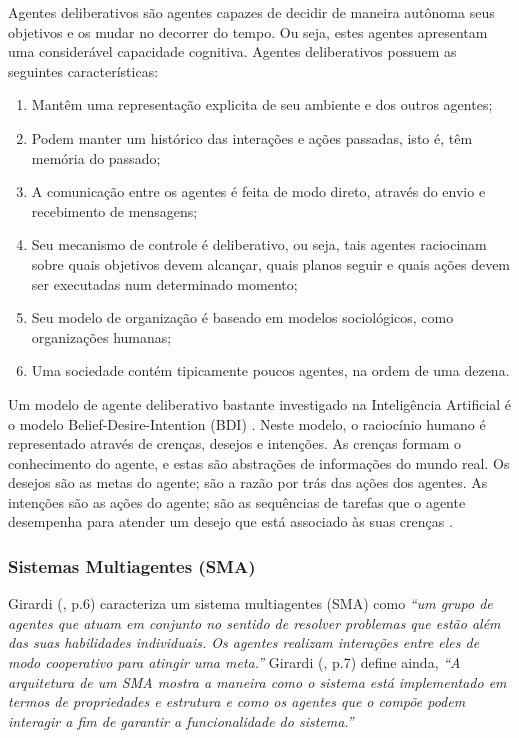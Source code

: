 Agentes deliberativos são agentes capazes de decidir de maneira autônoma seus objetivos e os mudar no decorrer do tempo. Ou seja, estes agentes apresentam uma considerável capacidade cognitiva. Agentes deliberativos possuem as seguintes características:
\begin{citacao}
\begin{enumerate}

	\item Mantêm uma representação explicita de seu ambiente e dos outros agentes;
	\item Podem manter um histórico das interações e ações passadas, isto é, têm memória do passado;
	\item A comunicação entre os agentes é feita de modo direto, através do envio e recebimento de mensagens;
	\item Seu mecanismo de controle é deliberativo, ou seja, tais agentes raciocinam sobre quais objetivos devem alcançar, quais planos seguir e quais ações devem ser executadas num determinado momento;
	\item Seu modelo de organização é baseado em modelos sociológicos, como organizações humanas;
	\item Uma sociedade contém tipicamente poucos agentes, na ordem de uma dezena.
	 \newline {}

\end{enumerate}
\end{citacao}

Um modelo de agente deliberativo bastante investigado na Inteligência Artificial é o modelo Belief-Desire-Intention (BDI) . Neste modelo, o raciocínio humano é representado através de crenças, desejos e intenções. As crenças formam o conhecimento do agente, e estas são abstrações de informações do mundo real. Os desejos são as metas do agente; são a razão por trás das ações dos agentes. As intenções são as ações do agente; são as sequências de tarefas que o agente desempenha para atender um desejo que está associado às suas crenças \cite[p. 31]{serrano2011}.

\subsubsection{Sistemas Multiagentes (SMA)}

Girardi (\citeyear{girardi2004}, p.6) caracteriza um sistema multiagentes (SMA) como \textit{“um grupo de agentes que atuam em conjunto no sentido de resolver problemas que estão além das suas habilidades individuais. Os agentes realizam interações entre eles de modo cooperativo para atingir uma meta.”} Girardi (\citeyear{girardi2004}, p.7) define ainda, \textit{“A arquitetura  de um SMA mostra a maneira como o sistema está implementado em termos de propriedades e estrutura e como os agentes que o compõe podem interagir a fim de garantir a funcionalidade do sistema.”}

